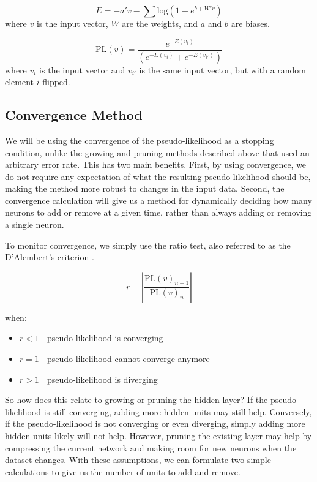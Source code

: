 \begin{equation}
E = -a'v - \sum \mathrm{log}(1 + e^{b + W'v}) \label{eq.energy}
\end{equation}
where $v$ is the input vector, $W$ are the weights, and $a$ and $b$ are biases.

\begin{equation}
\mathrm{PL}(v) = \frac{e^{-E(v_i)}}{(e^{-E(v_i)} + e^{-E(v_{i'})})} \label{eq.likelihood}
\end{equation}
where $v_i$ is the input vector and $v_{i'}$ is the same input vector, but with a 
random element $i$ flipped.

\subsection{Convergence Method}

We will be using the convergence of 
the pseudo-likelihood as a stopping condition, 
unlike the growing and pruning methods described above that 
used an arbitrary error rate.
This has two main benefits. 
First, by using convergence, we do not require any expectation 
of what the resulting pseudo-likelihood should be, 
making the method more robust to changes in the input data.
Second, the convergence calculation will give us a 
method for dynamically deciding how many neurons to add or remove 
at a given time, rather than always adding or removing a single 
neuron.

To monitor convergence, we simply use the ratio test, also referred to as the D'Alembert's criterion \citep{ratio-test}.

\begin{equation}
r = |\frac{\mathrm{PL}(v)_{n+1}}{\mathrm{PL}(v)_{n}}| \label{eq.conv}
\end{equation}

when:
\begin{itemize}
\item[] $r < 1$ | pseudo-likelihood is converging
\item[] $r = 1$ | pseudo-likelihood cannot converge anymore
\item[] $r > 1$ | pseudo-likelihood is diverging
\end{itemize}


So how does this relate to growing or pruning the hidden layer? 
If the pseudo-likelihood is still converging, adding more hidden units 
may still help. 
Conversely, if the pseudo-likelihood 
is not converging or even diverging, simply adding more hidden 
units likely will not help. 
However, pruning the existing layer 
may help by compressing the current network and 
making room for new neurons when the dataset changes. 
With these assumptions, we can formulate two simple 
calculations to give us the number of units to add and remove.


